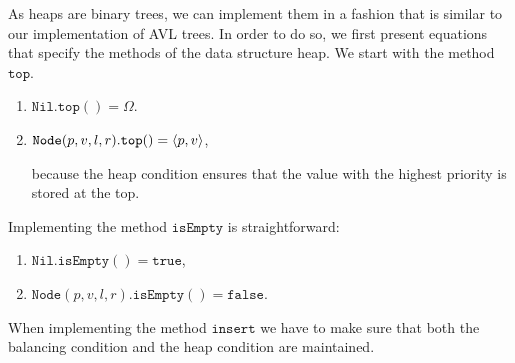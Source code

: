 As heaps are binary trees, we can implement them in a fashion that is similar to our implementation
of AVL trees.  In order to do so, we first present equations that specify the methods of the data
structure heap.  We start with the method $\texttt{top}$.  
\begin{enumerate}
\item $\texttt{Nil}.\texttt{top}() = \Omega$.
\item $\texttt{Node}(p,v,l,r).\texttt{top}() = \pair(p,v)$,

      because the heap condition ensures that the value with the highest priority is stored at the
      top. 
\end{enumerate}
Implementing the method $\texttt{isEmpty}$ is straightforward:
\begin{enumerate}
\item $\texttt{Nil}.\texttt{isEmpty}() = \texttt{true}$,
\item $\texttt{Node}(p,v,l,r).\texttt{isEmpty}() = \texttt{false}$.
\end{enumerate}
When  implementing the method $\texttt{insert}$ we have to make sure that both the balancing condition
and the heap condition are maintained.
